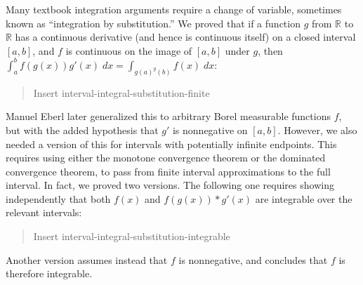 \documentclass{svjour3}
\newcommand{\todo}[1]{{\color{red}#1}}
\newcommand{\RR}{\mathbb{R}}
\begin{document}
Many textbook integration arguments require a change of variable, sometimes known as ``integration by substitution.'' We proved that if a function $g$ from $\RR$ to $\RR$ has a continuous derivative (and hence is continuous itself) on a closed interval $[a,b]$, and $f$ is continuous on the image of $[a, b]$ under $g$, then $\int_a^b f(g(x)) g'(x) \; dx = \int_{g(a)^g(b)} f(x) \; dx$:
\begin{quote}
 \todo{Insert interval-integral-substitution-finite}
\end{quote}
Manuel Eberl later generalized this to arbitrary Borel measurable functions $f$, but with the added hypothesis that $g'$ is nonnegative on $[a, b]$. However, we also needed a version of this for intervals with potentially infinite endpoints. This requires using either the monotone convergence theorem or the dominated convergence theorem, to pass from finite interval approximations to the full interval. In fact, we proved two versions. The following one requires showing independently that both $f(x)$ and $f(g(x)) * g'(x)$ are integrable over the relevant intervals:
\begin{quote}
 \todo{Insert interval-integral-substitution-integrable}
\end{quote}
Another version assumes instead that $f$ is nonnegative, and concludes that $f$ is therefore integrable.
\end{document}
